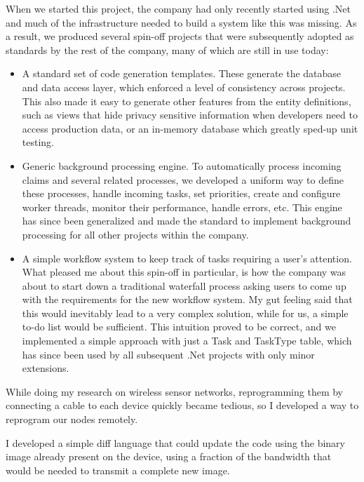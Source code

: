 \documentclass[10pt,a4paper]{../altacv}
\begin{document}
\begin{fullwidth}
\medskip

When we started this project, the company had only recently started using .Net and much of the infrastructure needed to build a system like this was missing. As a result, we produced several spin-off projects that were subsequently adopted as standards by the rest of the company, many of which are still in use today:
\begin{itemize}
	\item A standard set of code generation templates. These generate the database and data access layer, which enforced a level of consistency across projects. This also made it easy to generate other features from the entity definitions, such as views that hide privacy sensitive information when developers need to access production data, or an in-memory database which greatly sped-up unit testing.
	\item Generic background processing engine. To automatically process incoming claims and several related processes, we developed a uniform way to define these processes, handle incoming tasks, set priorities, create and configure worker threads, monitor their performance, handle errors, etc. This engine has since been generalized and made the standard to implement background processing for all other projects within the company.
	\item A simple workflow system to keep track of tasks requiring a user's attention. What pleased me about this spin-off in particular, is how the company was about to start down a traditional waterfall process asking users to come up with the requirements for the new workflow system. My gut feeling said that this would inevitably lead to a very complex solution, while for us, a simple to-do list would be sufficient. This intuition proved to be correct, and we implemented a simple approach with just a Task and TaskType table, which has since been used by all subsequent .Net projects with only minor extensions.
\end{itemize}

While doing my research on wireless sensor networks, reprogramming them by connecting a cable to each device quickly became tedious, so I developed a way to reprogram our nodes remotely.

\medskip

I developed a simple diff language that could update the code using the binary image already present on the device, using a fraction of the bandwidth that would be needed to transmit a complete new image.


\end{fullwidth}
\end{document}
